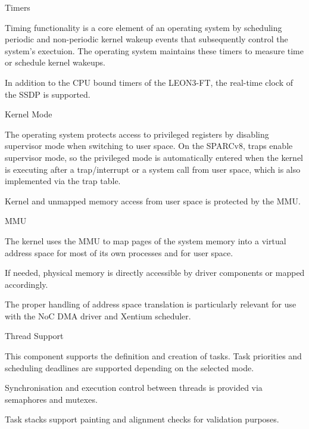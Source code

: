 %
{Timers}{%
Timing functionality is a core element of an operating system by scheduling
periodic and non-periodic kernel wakeup events that subsequently control the
system's exectuion. The operating system maintains these timers to
measure time or schedule kernel wakeups.

In addition to the \gls{CPU} bound timers of the \gls{LEON3-FT}, the real-time clock of the \gls{SSDP}
is supported.
}%
{}{}


%
{Kernel Mode}{%
The operating system protects access to privileged registers by disabling
supervisor mode when switching to user space. On the \gls{SPARC}v8, traps enable
supervisor mode, so the privileged mode is automatically entered when the kernel
is executing after a trap/interrupt or a system call from user space, which is
also implemented via the trap table.\newline

Kernel and unmapped memory access from user space is protected by the \gls{MMU}.
}%
{}{}


%
{\gls{MMU}}{%
The kernel uses the \gls{MMU} to map pages of the system memory into a virtual
address space for most of its own processes and for user space.

If needed, physical memory is directly accessible by driver components or
mapped accordingly.

}%
{}{The proper handling of address space translation
is particularly relevant for use with the \gls{NoC} \gls{DMA} driver and
\gls{Xentium} scheduler.}



%
{Thread Support}{%
This component supports the definition and creation of tasks. Task priorities
and scheduling deadlines are supported depending on the selected mode.\newline

Synchronisation and execution control between threads is provided via semaphores
and mutexes.

Task stacks support painting and alignment checks for validation purposes.
}%
{}{}


